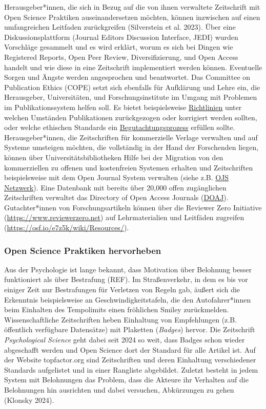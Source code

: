 \documentclass[
  letterpaper,
  DIV=11,
  numbers=noendperiod]{scrreprt}
\begin{document}
Herausgeber*innen, die sich in Bezug auf die von ihnen verwaltete
Zeitschrift mit Open Science Praktiken auseinandersetzen möchten, können
inzwischen auf einen umfangreichen Leitfaden zurückgreifen (Silverstein
et al. 2023). Über eine Diskussionsplattform (Journal Editors Discussion
Interface, JEDI) wurden Vorschläge gesammelt und es wird erklärt, worum
es sich bei Dingen wie Registered Reports, Open Peer Review,
Diversifizierung, und Open Access handelt und wie diese in eine
Zeitschrift implementiert werden können. Eventuelle Sorgen und Ängste
werden angesprochen und beantwortet. Das Committee on Publication Ethics
(COPE) setzt sich ebenfalls für Aufklärung und Lehre ein, die
Herausgeber, Universitäten, und Forschungsinstitute im Umgang mit
Problemen im Publikationssystem helfen soll. Es bietet beispielsweise
\href{https://publicationethics.org/retraction-guidelines}{Richtlinien}
unter welchen Umständen Publikationen zurückgezogen oder korrigiert
werden sollten, oder welche ethischen Standards ein
\href{https://publicationethics.org/resources/guidelines/cope-ethical-guidelines-peer-reviewers}{Begutachtungsprozess}
erfüllen sollte. Herausgeber*innen, die Zeitschriften für kommerzielle
Verlage verwalten und auf Systeme umsteigen möchten, die vollständig in
der Hand der Forschenden liegen, können über Universitätsbibliotheken
Hilfe bei der Migration von den kommerziellen zu offenen und
kostenfreien Systemen erhalten und Zeitschriften beispielsweise mit dem
Open Journal System verwalten (siehe z.B.
\href{https://ojs-de.net/start}{OJS Netzwerk}). Eine Datenbank mit
bereits über 20,000 offen zugänglichen Zeitschriften verwaltet das
Directory of Open Access Journals (\href{https://doaj.org}{DOAJ}).
Gutachter*innen von Forschungsartikeln können über die Reviewer Zero
Initiative (\url{https://www.reviewerzero.net}) auf Lehrmaterialien und
Leitfäden zugreifen (\url{https://osf.io/e7z5k/wiki/Resources/}).

\subsubsection{Open Science Praktiken
hervorheben}\label{open-science-praktiken-hervorheben}

Aus der Psychologie ist lange bekannt, dass Motivation über Belohnung
besser funktioniert als über Bestrafung (REF). Im Straßenverkehr, in dem
es bis vor einiger Zeit nur Bestrafungen für Verletzen von Regeln gab,
äußert sich die Erkenntnis beispielsweise an Geschwindigkeitstafeln, die
den Autofahrer*innen beim Einhalten des Tempolimits einen fröhlichen
Smiley zurückmelden. Wissenschaftliche Zeitschriften heben Einhaltung
von Empfehlungen (z.B. öffentlich verfügbare Datensätze) mit Plaketten
(\emph{Badges}) hervor. Die Zeitschrift \emph{Psychological Science}
geht dabei seit 2024 so weit, dass Badges schon wieder abgeschafft
werden und Open Science dort der Standard für alle Artikel ist. Auf der
Website topfactor.org sind Zeitschriften und deren Einhaltung
verschiedener Standards aufgelistet und in einer Rangliste abgebildet.
Zuletzt besteht in jedem System mit Belohnungen das Problem, dass die
Akteure ihr Verhalten auf die Belohnungen hin ausrichten und dabei
versuchen, Abkürzungen zu gehen (Klonsky 2024).
\end{document}
